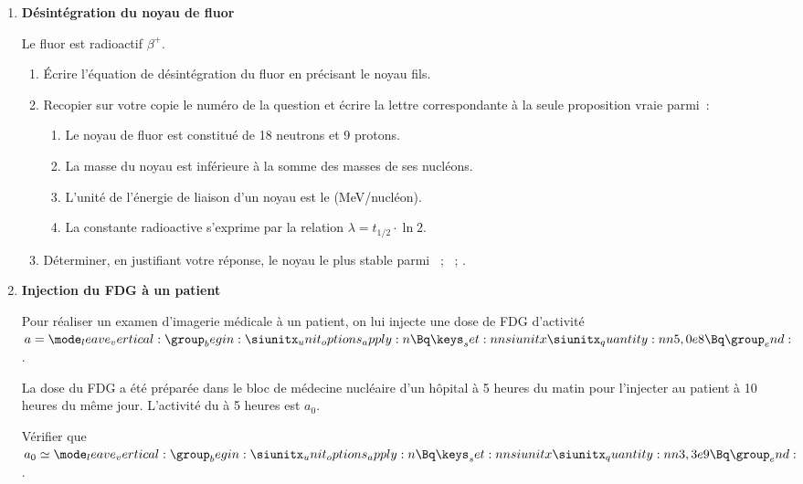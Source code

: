 \begin{enumerate}
    \item \textbf{Désintégration du noyau de fluor }

          Le fluor  est radioactif $\beta^{+}$.
          \begin{enumerate}
              \item Écrire l'équation de désintégration du fluor 
                    en précisant le noyau fils.
              \item Recopier sur votre copie le numéro de la question et écrire la
                    lettre correspondante à la seule proposition vraie parmi~:
                    \begin{enumerate}
                        \item Le noyau de fluor  est constitué de
                              18 neutrons et 9 protons.
                        \item La masse du noyau  est inférieure à
                              la somme des masses de ses nucléons.
                        \item L'unité de l'énergie de liaison d'un noyau est le
                              (\unit{\MeV}/nucléon).
                        \item La constante radioactive s'exprime par la relation
                              $\lambda=t_{1/2} \cdot \ln 2$.
                    \end{enumerate}
              \item Déterminer, en justifiant votre réponse, le noyau le plus
                    stable parmi ~; ~;
                    .
          \end{enumerate}

    \item \textbf{Injection du FDG à un patient}

          Pour réaliser un examen d'imagerie médicale à un patient, on lui
          injecte une dose de FDG d'activité $a=\qty{5,0e8}{\Bq}$.

          La dose du FDG a été préparée dans le bloc de médecine nucléaire d'un
          hôpital à 5 heures du matin pour l'injecter au patient à 10 heures du
          même jour. L'activité du  à 5 heures est $a_{0}$.

          Vérifier que $a_{0} \simeq \qty{3,3e9}{\Bq}$.
\end{enumerate}


